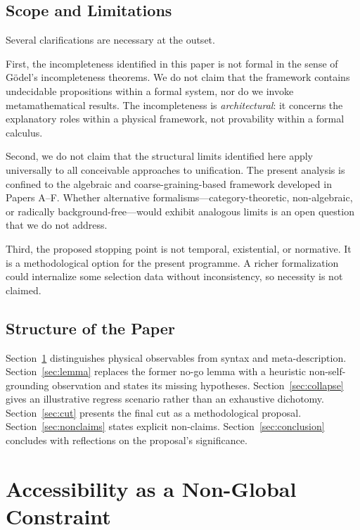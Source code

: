 \documentclass[12pt,a4paper]{article}
\begin{document}
\subsection{Scope and Limitations}

Several clarifications are necessary at the outset.

First, the incompleteness identified in this paper is not formal in the sense of G\"{o}del's incompleteness theorems. We do not claim that the framework contains undecidable propositions within a formal system, nor do we invoke metamathematical results. The incompleteness is \emph{architectural}: it concerns the explanatory roles within a physical framework, not provability within a formal calculus.

Second, we do not claim that the structural limits identified here apply universally to all conceivable approaches to unification. The present analysis is confined to the algebraic and coarse-graining-based framework developed in Papers A--F. Whether alternative formalisms---category-theoretic, non-algebraic, or radically background-free---would exhibit analogous limits is an open question that we do not address.

Third, the proposed stopping point is not temporal, existential, or normative.  It is a methodological option for the present programme.  A richer formalization could internalize some selection data without inconsistency, so necessity is not claimed.

\subsection{Structure of the Paper}

Section~\ref{sec:accessibility} distinguishes physical observables from syntax and meta-description. Section~\ref{sec:lemma} replaces the former no-go lemma with a heuristic non-self-grounding observation and states its missing hypotheses. Section~\ref{sec:collapse} gives an illustrative regress scenario rather than an exhaustive dichotomy. Section~\ref{sec:cut} presents the final cut as a methodological proposal. Section~\ref{sec:nonclaims} states explicit non-claims. Section~\ref{sec:conclusion} concludes with reflections on the proposal's significance.

\section{Accessibility as a Non-Global Constraint}
\label{sec:accessibility}
\end{document}
